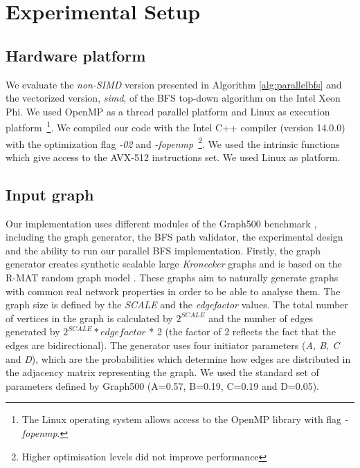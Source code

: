 \documentclass{sig-alternate-05-2015}
\begin{document}
\section{Experimental Setup}
\label{sec:exp}
\subsection{Hardware platform}
We evaluate the \textit{non-SIMD} version presented in Algorithm
\ref{alg:parallelbfs} and the vectorized version, \textit{simd}, of
the BFS top-down algorithm on the Intel Xeon Phi. We used OpenMP as a
thread parallel platform and Linux as execution platform~\footnote{The Linux operating system allows access to the OpenMP library with flag \textit{-fopenmp}.}. We compiled our code with the Intel C++
compiler (version 14.0.0) with the optimization flag \textit{-02} and
\textit{-fopenmp}~\footnote{Higher optimisation levels did not improve
  performance}. We used the intrinsic functions which give access to
the AVX-512 instructions set. We used Linux as platform.


\subsection{Input graph}
Our implementation uses different modules of the Graph500 benchmark
\cite{graph500}, including the graph generator, the BFS path
validator, the experimental design and the ability to run our parallel
BFS implementation.  Firstly, the graph generator creates synthetic
scalable large \textit{Kronecker} graphs \cite{Kronecker} and is based
on the R-MAT random graph model \cite{RMAT}. These graphs aim to
naturally generate graphs with common real network properties in order
to be able to analyse them. The graph size is defined by the
\textit{SCALE} and the \textit{edgefactor} values. The total number of
vertices in the graph is calculated by $2^{SCALE}$ and the number of
edges generated by $2^{SCALE} * edgefactor$ * 2 (the factor of 2
reflects the fact that the edges are bidirectional). The generator
uses four initiator parameters (\textit{A, B, C} and \textit{D}),
which are the probabilities which determine how edges are distributed
in the adjacency matrix representing the graph. We used the standard
set of parameters defined by Graph500 (A=0.57, B=0.19, C=0.19 and
D=0.05).
\end{document}
